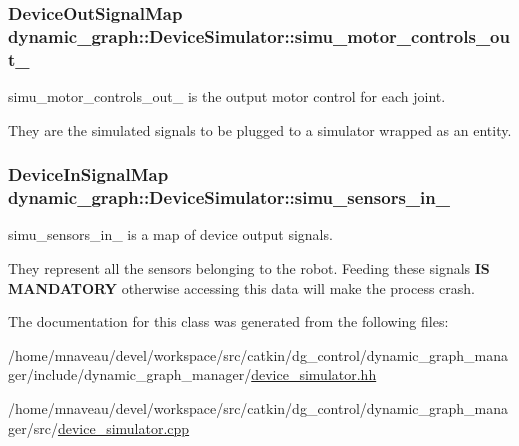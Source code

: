 \subsubsection[{\texorpdfstring{simu\+\_\+motor\+\_\+controls\+\_\+out\+\_\+}{simu_motor_controls_out_}}]{\setlength{\rightskip}{0pt plus 5cm}Device\+Out\+Signal\+Map dynamic\+\_\+graph\+::\+Device\+Simulator\+::simu\+\_\+motor\+\_\+controls\+\_\+out\+\_\+}\hypertarget{classdynamic__graph_1_1DeviceSimulator_abbbcc26f173788b15a395ff87f3925e1}{}\label{classdynamic__graph_1_1DeviceSimulator_abbbcc26f173788b15a395ff87f3925e1}


simu\+\_\+motor\+\_\+controls\+\_\+out\+\_\+ is the output motor control for each joint. 

They are the simulated signals to be plugged to a simulator wrapped as an entity. 
\subsubsection[{\texorpdfstring{simu\+\_\+sensors\+\_\+in\+\_\+}{simu_sensors_in_}}]{\setlength{\rightskip}{0pt plus 5cm}Device\+In\+Signal\+Map dynamic\+\_\+graph\+::\+Device\+Simulator\+::simu\+\_\+sensors\+\_\+in\+\_\+}\hypertarget{classdynamic__graph_1_1DeviceSimulator_a8640ee078f06fc5f31efcb2b35c9ed99}{}\label{classdynamic__graph_1_1DeviceSimulator_a8640ee078f06fc5f31efcb2b35c9ed99}


simu\+\_\+sensors\+\_\+in\+\_\+ is a map of device output signals. 

They represent all the sensors belonging to the robot. Feeding these signals {\bfseries  IS M\+A\+N\+D\+A\+T\+O\+RY } otherwise accessing this data will make the process crash. 

The documentation for this class was generated from the following files\+:\begin{DoxyCompactItemize}
\item 
/home/mnaveau/devel/workspace/src/catkin/dg\+\_\+control/dynamic\+\_\+graph\+\_\+manager/include/dynamic\+\_\+graph\+\_\+manager/\hyperlink{device__simulator_8hh}{device\+\_\+simulator.\+hh}\item 
/home/mnaveau/devel/workspace/src/catkin/dg\+\_\+control/dynamic\+\_\+graph\+\_\+manager/src/\hyperlink{device__simulator_8cpp}{device\+\_\+simulator.\+cpp}\end{DoxyCompactItemize}
